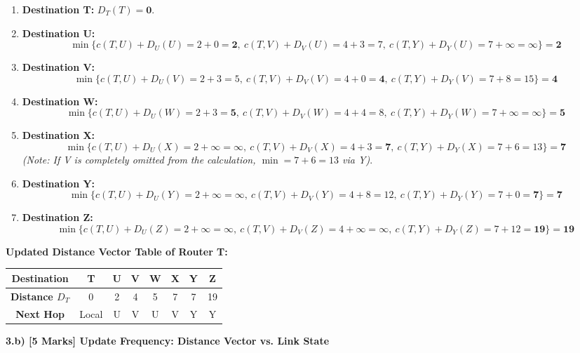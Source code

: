 \documentclass[11pt,a4paper]{article}
\begin{document}
\begin{enumerate}
    \item \textbf{Destination T:} $D_T(T) = \mathbf{0}$.
    \item \textbf{Destination U:}
    \[
    \min \{ c(T,U)+D_U(U)=2+0=\mathbf{2}, \ c(T,V)+D_V(U)=4+3=7, \ c(T,Y)+D_Y(U)=7+\infty=\infty \} = \mathbf{2}
    \]
    \item \textbf{Destination V:}
    \[
    \min \{ c(T,U)+D_U(V)=2+3=5, \ c(T,V)+D_V(V)=4+0=\mathbf{4}, \ c(T,Y)+D_Y(V)=7+8=15 \} = \mathbf{4}
    \]
    \item \textbf{Destination W:}
    \[
    \min \{ c(T,U)+D_U(W)=2+3=\mathbf{5}, \ c(T,V)+D_V(W)=4+4=8, \ c(T,Y)+D_Y(W)=7+\infty=\infty \} = \mathbf{5}
    \]
    \item \textbf{Destination X:}
    \[
    \min \{ c(T,U)+D_U(X)=2+\infty=\infty, \ c(T,V)+D_V(X)=4+3=\mathbf{7}, \ c(T,Y)+D_Y(X)=7+6=13 \} = \mathbf{7}
    \]
    \textit{(Note: If V is completely omitted from the calculation, $\min = 7+6 = 13$ via Y)}.
    \item \textbf{Destination Y:}
    \[
    \min \{ c(T,U)+D_U(Y)=2+\infty=\infty, \ c(T,V)+D_V(Y)=4+8=12, \ c(T,Y)+D_Y(Y)=7+0=\mathbf{7} \} = \mathbf{7}
    \]
    \item \textbf{Destination Z:}
    \[
    \min \{ c(T,U)+D_U(Z)=2+\infty=\infty, \ c(T,V)+D_V(Z)=4+\infty=\infty, \ c(T,Y)+D_Y(Z)=7+12=\mathbf{19} \} = \mathbf{19}
    \]
\end{enumerate}

\textbf{Updated Distance Vector Table of Router T:}
\begin{center}
\begin{tabular}{|c|c|c|c|c|c|c|c|}
\hline
\textbf{Destination} & \textbf{T} & \textbf{U} & \textbf{V} & \textbf{W} & \textbf{X} & \textbf{Y} & \textbf{Z} \\
\hline
\textbf{Distance $D_T$} & 0 & 2 & 4 & 5 & 7 & 7 & 19 \\
\hline
\textbf{Next Hop} & Local & U & V & U & V & Y & Y \\
\hline
\end{tabular}
\end{center}

\vspace{0.2cm}
\textbf{3.b) [5 Marks] Update Frequency: Distance Vector vs. Link State}
\end{document}
